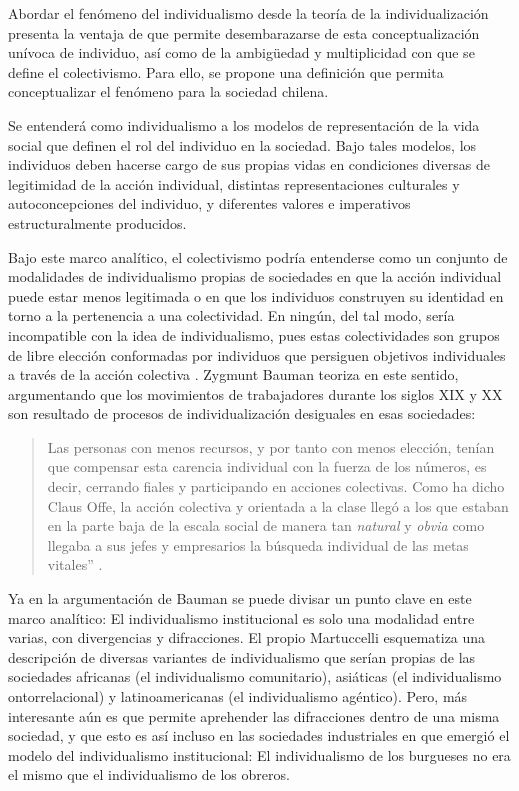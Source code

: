 \documentclass[12pt,twoside]{templates/facsothesis}
\begin{document}
Abordar el fenómeno del individualismo desde la teoría de la individualización presenta la ventaja de que permite desembarazarse de esta conceptualización unívoca de individuo, así como de la ambigüedad y multiplicidad con que se define el colectivismo. Para ello, se propone una definición que permita conceptualizar el fenómeno para la sociedad chilena.

Se entenderá como individualismo a los modelos de representación de la vida social que definen el rol del individuo en la sociedad. Bajo tales modelos, los individuos deben hacerse cargo de sus propias vidas en condiciones diversas de legitimidad de la acción individual, distintas representaciones culturales y autoconcepciones del individuo, y diferentes valores e imperativos estructuralmente producidos.

Bajo este marco analítico, el colectivismo podría entenderse como un conjunto de modalidades de individualismo propias de sociedades en que la acción individual puede estar menos legitimada o en que los individuos construyen su identidad en torno a la pertenencia a una colectividad. En ningún, del tal modo, sería incompatible con la idea de individualismo, pues estas colectividades son grupos de libre elección conformadas por individuos que persiguen objetivos individuales a través de la acción colectiva \citep{arribas1999, moemeka1998}. Zygmunt Bauman teoriza en este sentido, argumentando que los movimientos de trabajadores durante los siglos XIX y XX son resultado de procesos de individualización desiguales en esas sociedades:

\begin{quote}
Las personas con menos recursos, y por tanto con menos elección, tenían que compensar esta carencia individual con la fuerza de los números, es decir, cerrando fiales y participando en acciones colectivas. Como ha dicho Claus Offe, la acción colectiva y orientada a la clase llegó a los que estaban en la parte baja de la escala social de manera tan \emph{natural} y \emph{obvia} como llegaba a sus jefes y empresarios la búsqueda individual de las metas vitales'' \citep[p.~23]{bauman2003}.
\end{quote}

Ya en la argumentación de Bauman se puede divisar un punto clave en este marco analítico: El individualismo institucional es solo una modalidad entre varias, con divergencias y difracciones. El propio Martuccelli \citeyearpar{martuccelli2018} esquematiza una descripción de diversas variantes de individualismo que serían propias de las sociedades africanas (el individualismo comunitario), asiáticas (el individualismo ontorrelacional) y latinoamericanas (el individualismo agéntico). Pero, más interesante aún es que permite aprehender las difracciones dentro de una misma sociedad, y que esto es así incluso en las sociedades industriales en que emergió el modelo del individualismo institucional: El individualismo de los burgueses no era el mismo que el individualismo de los obreros.
\end{document}

